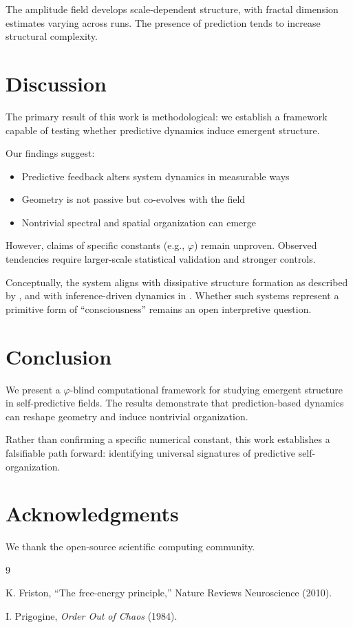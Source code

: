 \documentclass[twocolumn]{article}
\begin{document}
The amplitude field develops scale-dependent structure, with fractal dimension estimates varying across runs. The presence of prediction tends to increase structural complexity.

\section{Discussion}

The primary result of this work is methodological: we establish a framework capable of testing whether predictive dynamics induce emergent structure.

Our findings suggest:

\begin{itemize}
\item Predictive feedback alters system dynamics in measurable ways
\item Geometry is not passive but co-evolves with the field
\item Nontrivial spectral and spatial organization can emerge
\end{itemize}

However, claims of specific constants (e.g., $\varphi$) remain unproven. Observed tendencies require larger-scale statistical validation and stronger controls.

Conceptually, the system aligns with dissipative structure formation as described by \cite{prigogine1984}, and with inference-driven dynamics in \cite{friston2010}. Whether such systems represent a primitive form of ``consciousness'' remains an open interpretive question.

\section{Conclusion}

We present a $\varphi$-blind computational framework for studying emergent structure in self-predictive fields. The results demonstrate that prediction-based dynamics can reshape geometry and induce nontrivial organization.

Rather than confirming a specific numerical constant, this work establishes a falsifiable path forward: identifying universal signatures of predictive self-organization.

\section*{Acknowledgments}

We thank the open-source scientific computing community.


\begin{thebibliography}{9}

K. Friston, ``The free-energy principle,'' Nature Reviews Neuroscience (2010).

I. Prigogine, \emph{Order Out of Chaos} (1984).

\end{thebibliography}
\end{document}
